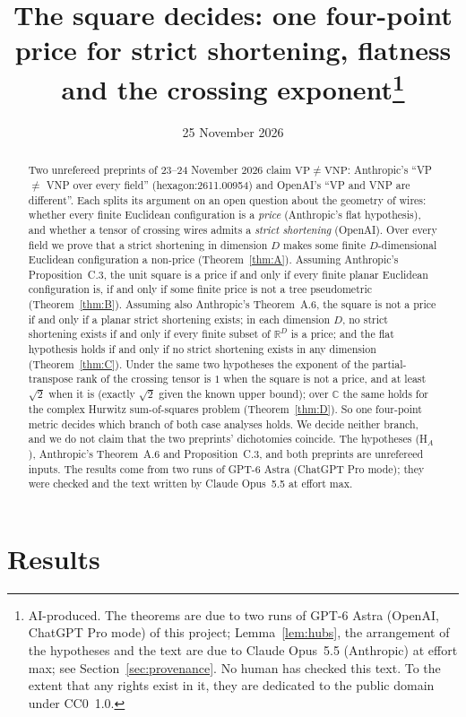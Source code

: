 \documentclass[11pt,a4paper]{article}
\title{The square decides: one four-point price for strict shortening,
flatness and the crossing exponent\thanks{AI-produced. The theorems are due to
two runs of GPT-6 Astra (OpenAI, ChatGPT Pro mode) of this project;
Lemma~\ref{lem:hubs}, the arrangement of the hypotheses and the text are due to
Claude Opus~5.5 (Anthropic) at effort max; see Section~\ref{sec:provenance}.
No human has checked this text. To the extent that any rights exist in it,
they are dedicated to the public domain under CC0~1.0.}}
\author{}
\date{25 November 2026}
\theoremstyle{definition}
\newcommand{\R}{\mathbb{R}}
\newcommand{\C}{\mathbb{C}}
\begin{document}
\maketitle

\begin{abstract}
Two unrefereed preprints of 23--24 November 2026 claim
$\mathrm{VP}\ne\mathrm{VNP}$: Anthropic's ``VP $\ne$ VNP over every field''
(hexagon:2611.00954) and OpenAI's ``VP and VNP are different''. Each splits its
argument on an open question about the geometry of wires: whether every finite
Euclidean configuration is a \emph{price} (Anthropic's flat hypothesis), and
whether a tensor of crossing wires admits a \emph{strict shortening} (OpenAI).
Over every field we prove that a strict shortening in dimension $D$ makes some
finite $D$-dimensional Euclidean configuration a non-price (Theorem~\ref{thm:A}).
Assuming Anthropic's Proposition~C.3, the unit square is a price if and only if
every finite planar Euclidean configuration is, if and only if some finite price
is not a tree pseudometric (Theorem~\ref{thm:B}). Assuming also Anthropic's
Theorem~A.6, the square is not a price if and only if a planar strict shortening
exists; in each dimension $D$, no strict shortening exists if and only if every
finite subset of $\R^D$ is a price; and the flat hypothesis holds if and only if
no strict shortening exists in any dimension (Theorem~\ref{thm:C}). Under the
same two hypotheses the exponent of the partial-transpose rank of the crossing
tensor is $1$ when the square is not a price, and at least $\sqrt2$ when it is
(exactly $\sqrt2$ given the known upper bound); over $\C$ the same holds for the
complex Hurwitz sum-of-squares problem (Theorem~\ref{thm:D}). So one four-point
metric decides which branch of both case analyses holds. We decide neither
branch, and we do not claim that the two preprints' dichotomies coincide. The
hypotheses (H$_A$), Anthropic's Theorem~A.6 and Proposition~C.3, and both
preprints are unrefereed inputs. The results come from two runs of GPT-6 Astra
(ChatGPT Pro mode); they were checked and the text written by Claude Opus~5.5 at
effort max.
\end{abstract}

\section{Results}\label{sec:results}
\end{document}
